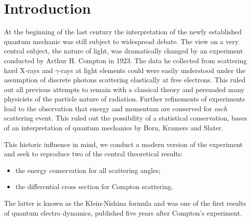 \section{Introduction}

At the beginning of the last century the interpretation of the newly established quantum mechanic was still subject to
widespread debate. The view on a very central subject, the nature of light, was dramatically changed by an experiment 
conducted by Arthur H. Compton in 1923. The data he collected from scattering hard X-rays and $\gamma$-rays at light 
elements could were easily understood under the assumption of discrete photons scattering elastically at free electrons. 
This ruled out all previous attempts to remain with a classical theory and persuaded many physicists of the 
particle nature of radiation. Further refinements of experiments lead to the observation that energy and momentum are 
conserved for \textit{each} scattering event. This ruled out the possibility of a statistical conservation, bases of an
interpretation of quantum mechanics by Born, Kramers and Slater. 

This historic influence in mind, we conduct a modern version of the experiment and seek to reproduce two of the central 
theoretical results:
\begin{itemize}
    \item the energy conservation for all scattering angles;
    \item the differential cross section for Compton scattering.
\end{itemize}
The latter is known as the Klein-Nishina formula and was one of the first results of quantum electro dynamics, published
five years after Compton's experiment.
